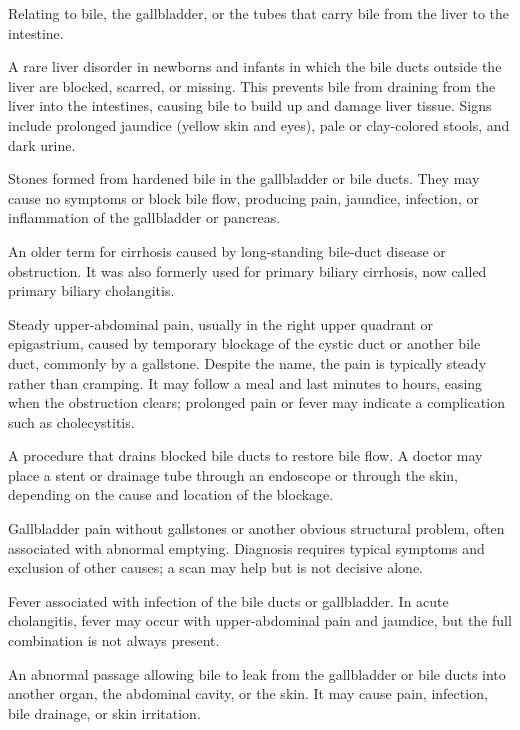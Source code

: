  Relating to bile, the gallbladder, or the tubes that carry bile from the liver to the intestine.

 A rare liver disorder in newborns and infants in which the bile ducts outside the liver are blocked, scarred, or missing. This prevents bile from draining from the liver into the intestines, causing bile to build up and damage liver tissue. Signs include prolonged jaundice (yellow skin and eyes), pale or clay-colored stools, and dark urine.


 Stones formed from hardened bile in the gallbladder or bile ducts. They may cause no symptoms or block bile flow, producing pain, jaundice, infection, or inflammation of the gallbladder or pancreas.

 An older term for cirrhosis caused by long-standing
bile-duct disease or obstruction. It was also formerly used for primary
biliary cirrhosis, now called primary biliary cholangitis.

 Steady upper-abdominal pain, usually in the right upper quadrant or
epigastrium, caused by temporary blockage of the cystic duct or another bile duct, commonly by a
gallstone. Despite the name, the pain is typically steady rather than cramping. It may follow a meal
and last minutes to hours, easing when the obstruction clears; prolonged pain or fever may indicate
a complication such as cholecystitis.

 A procedure that drains blocked bile ducts to restore bile flow. A doctor may place a stent or drainage tube through an endoscope or through the skin, depending on the cause and location of the blockage.

 Gallbladder pain without gallstones or another obvious structural problem, often associated with abnormal emptying. Diagnosis requires typical symptoms and exclusion of other causes; a scan may help but is not decisive alone.

 Fever associated with infection of the bile ducts or gallbladder. In acute cholangitis, fever may occur with upper-abdominal pain and jaundice, but the full combination is not always present.

 An abnormal passage allowing bile to leak from the gallbladder or bile ducts into another organ, the abdominal cavity, or the skin. It may cause pain, infection, bile drainage, or skin irritation.

